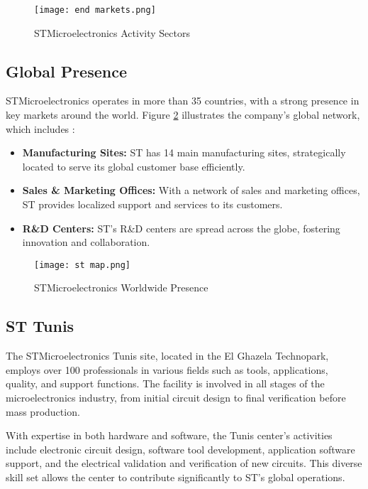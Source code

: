 \begin{figure}[H]
  \centering
  \texttt{[image: end markets.png]}
  \caption{STMicroelectronics Activity Sectors}
  \label{fig:talan_graphe}
\end{figure}

\subsection{Global Presence}

STMicroelectronics operates in more than 35 countries, with a strong presence in key markets around the world. Figure \ref{fig:map} illustrates the company's global network, which includes \cite{st_comp}:

\begin{itemize}
    \item \textbf{Manufacturing Sites:} ST has 14 main manufacturing sites, strategically located to serve its global customer base efficiently.
    \item \textbf{Sales \& Marketing Offices:} With a network of sales and marketing offices, ST provides localized support and services to its customers.
    \item \textbf{R\&D Centers:} ST's R\&D centers are spread across the globe, fostering innovation and collaboration.
\end{itemize}

\begin{figure}[H]
  \centering
  \texttt{[image: st map.png]}
  \caption{STMicroelectronics Worldwide Presence}
  \label{fig:map}
\end{figure}

\subsection{ST Tunis}

The STMicroelectronics Tunis site, located in the El Ghazela Technopark, employs over 100 professionals in various fields such as tools, applications, quality, and support functions. The facility is involved in all stages of the microelectronics industry, from initial circuit design to final verification before mass production.

With expertise in both hardware and software, the Tunis center's activities include electronic circuit design, software tool development, application software support, and the electrical validation and verification of new circuits. This diverse skill set allows the center to contribute significantly to ST's global operations.

